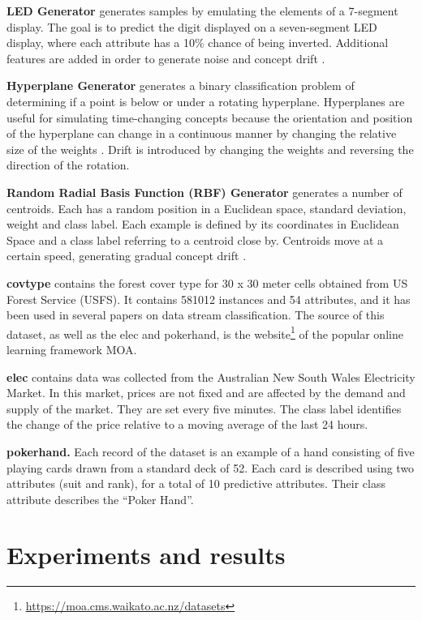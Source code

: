 \documentclass{sig-alternate-br}
\begin{document}
\textbf{LED Generator} generates samples by emulating the elements of a 7-segment display. The goal is to predict the digit displayed on a seven-segment LED display, where each attribute has a 10\% chance of being inverted. Additional features are added in order to generate noise and concept drift \cite{breiman1984classification}.

\textbf{Hyperplane Generator} generates a binary classification problem of determining if a point is below or under a rotating hyperplane. Hyperplanes are useful for simulating time-changing concepts because the orientation and position of the hyperplane can change in a continuous manner by changing the relative size of the weights \cite{hulten2001mining}. Drift is introduced by changing the weights and reversing the direction of the rotation.
    
\textbf{Random Radial Basis Function (RBF) Generator} generates a number of centroids. Each has a random position in a Euclidean space, standard deviation, weight and class label. Each example is defined by its coordinates in Euclidean Space and a class label referring to a centroid close by.  Centroids move at a certain speed, generating gradual concept drift \cite{van2016massively}.

\textbf{covtype} contains the forest cover type for 30 x 30 meter cells obtained from US Forest Service (USFS). It contains 581012 instances and 54 attributes, and it has been used in several papers on data stream classification. The source of this dataset, as well as the elec and pokerhand, is the website\footnote{\url{https://moa.cms.waikato.ac.nz/datasets}} of the popular online learning framework MOA.

\textbf{elec} contains data was collected from the Australian New South Wales Electricity Market. In this market, prices are not fixed and are affected by the demand and supply of the market. They are set every five minutes. The class label identifies the change of the price relative to a moving average of the last 24 hours.

\textbf{pokerhand.} Each record of the dataset is an example of a hand consisting of five playing cards drawn from a standard deck of 52. Each card is described using two attributes (suit and rank), for a total of 10 predictive attributes. Their class attribute describes the “Poker Hand”.

\section{Experiments and results}
\label{experiments}
\end{document}

